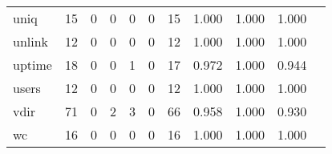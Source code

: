 \begin{longtable}{lp{1.2cm}p{1.2cm}p{1.2cm}p{1.2cm}p{1.2cm}p{1.2cm}p{1.2cm}p{1.2cm}p{1.2cm}p{1.2cm}}
uniq      &                                    15 &                                                  0 &                                                  0 &                                                  0 &                                                  0 &                                                 15 &                                         1.000 &                                              1.000 &                                              1.000 \\
unlink    &                                    12 &                                                  0 &                                                  0 &                                                  0 &                                                  0 &                                                 12 &                                         1.000 &                                              1.000 &                                              1.000 \\
uptime    &                                    18 &                                                  0 &                                                  0 &                                                  1 &                                                  0 &                                                 17 &                                         0.972 &                                              1.000 &                                              0.944 \\
users     &                                    12 &                                                  0 &                                                  0 &                                                  0 &                                                  0 &                                                 12 &                                         1.000 &                                              1.000 &                                              1.000 \\
vdir      &                                    71 &                                                  0 &                                                  2 &                                                  3 &                                                  0 &                                                 66 &                                         0.958 &                                              1.000 &                                              0.930 \\
wc        &                                    16 &                                                  0 &                                                  0 &                                                  0 &                                                  0 &                                                 16 &                                         1.000 &                                              1.000 &                                              1.000 \\

\end{longtable}
